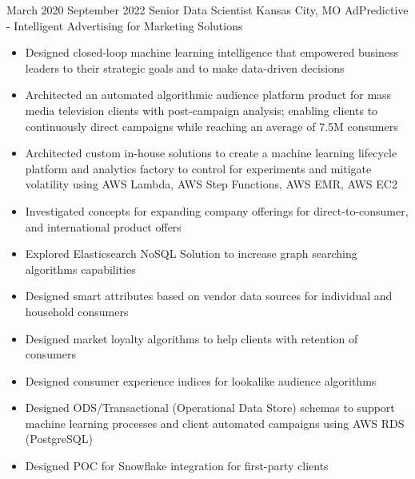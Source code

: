 
\ProjectExperienceTwoSection
{March 2020}
{September 2022}
{Senior Data Scientist}
{Kansas City, MO}
{AdPredictive - Intelligent Advertising for Marketing Solutions}
{
    \begin{itemize}
        \item Designed closed-loop machine learning intelligence that empowered
        business leaders to their strategic goals and to make data-driven
        decisions
        \item Architected an automated algorithmic audience platform product for
        mass media television clients with post-campaign analysis; enabling
        clients to continuously direct campaigns while reaching an average of
        7.5M consumers
        \item Architected custom in-house solutions to create a machine learning
        lifecycle platform and analytics factory to control for experiments and
        mitigate volatility using AWS Lambda, AWS Step Functions, AWS EMR, AWS
        EC2
    \end{itemize}
}
{
    \begin{itemize}
        \item Investigated concepts for expanding company offerings for
        direct-to-consumer, and international product offers
        \item Explored Elasticsearch NoSQL Solution to increase graph searching
        algorithms capabilities
        \item Designed smart attributes based on vendor data sources for
        individual and household consumers
        \item Designed market loyalty algorithms to help clients with retention
        of consumers
        \item Designed consumer experience indices for lookalike audience
        algorithms
        \item Designed ODS/Transactional (Operational Data Store) schemas to
        support machine learning processes and client automated campaigns using
        AWS RDS (PostgreSQL)
        \item Designed POC for Snowflake integration for first-party clients
    \end{itemize}
}